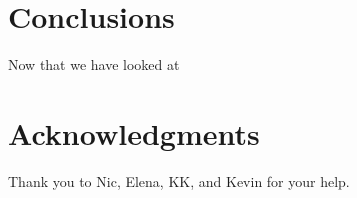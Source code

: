\documentclass{sig-alternate}
\begin{document}
\section{Conclusions}
\label{sec:conclusions}

Now that we have looked at

\section*{Acknowledgments}
\label{sec:acknowledgments}


Thank you to Nic, Elena, KK, and Kevin for your help.


  
\end{document}
